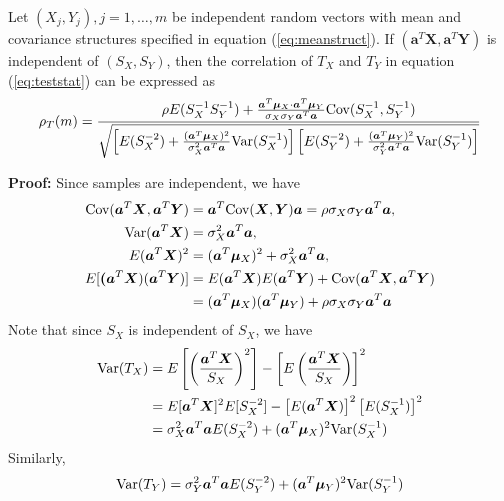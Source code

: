 \begin{theorem}\label{thm:teststatcor}
	Let $(X_j, Y_j), j = 1, \ldots, m$ be independent random vectors with mean and covariance 
	structures specified in equation (\ref{eq:meanstruct}). If $(\bm a^T\bm X, \bm a^T\bm Y)$ 
	is independent of $(S_X, S_Y)$, then the correlation of $T_X$ and $T_Y$ in equation 
	(\ref{eq:teststat}) can be expressed as 
	\begin{equation}\label{eq:teststatcor}
	\rho_T(m) = \frac{ \rho E(S_X^{-1}S_Y^{-1}) + \frac{\bm a^T\bm \mu_X\cdot \bm a^T\bm 
			\mu_Y}{\sigma_X\sigma_Y\bm a^T\bm a}\text{Cov}(S_X^{-1}, S_Y^{-1}) 
	}{\sqrt{\left[E(S_X^{-2}) 
		+ \frac{(\bm a^T\bm \mu_X)^2}{\sigma_X^2\bm a^T\bm 
			a}\text{Var}(S_X^{-1})\right]\left[E(S_Y^{-2}) + \frac{(\bm a^T\bm 
			\mu_Y)^2}{\sigma_Y^2\bm 
			a^T\bm a}\text{Var}(S_Y^{-1})\right]}}
\end{equation}
\end{theorem}
\textbf{Proof:} Since samples are independent, we have 
\begin{equation}\label{eq:testprepare}
\begin{aligned}
\text{Cov}(\bm a^T\bm X, \bm a^T\bm Y) &= \bm a^T \text{Cov}(\bm X, \bm Y)\bm a  = \rho\sigma_X\sigma_Y\bm 
a^T\bm a, \\
\text{Var}(\bm a^T\bm X)&  = \sigma_X^2\bm a^T\bm a, \\
E(\bm a^T\bm X)^2& =(\bm a^T\bm \mu_X)^2 + \sigma_X^2\bm a^T\bm a, \\
E[\bm (\bm a^T\bm X)(\bm a^T\bm Y)] &=E(\bm a^T\bm X)E(\bm a^T\bm Y) + \text{Cov}(\bm a^T\bm X, \bm 
a^T\bm Y)  	\\& = (\bm a^T\bm \mu_X)(\bm a^T\bm \mu_Y) + \rho \sigma_X\sigma_Y\bm a^T\bm a
\end{aligned}
\end{equation}
Note that since $S_X$ is independent of $S_X$, we have 
\begin{equation}\label{eq:testdenom1}
\begin{aligned}
\text{Var}(T_X) &= E\left[\left(\frac{\bm a^T\bm X}{S_X}\right)^2\right] - \left[E\left(\frac{\bm 
	a^T\bm X}{S_X}\right)\right]^2\\
& = E[\bm a^T\bm X]^2E[S_X^{-2}] - \left[E(\bm a^T\bm X)\right]^2\left[E(S_X^{-1})\right]^2\\
& = \sigma_X^2\bm a^T\bm a E(S_X^{-2}) + (\bm a^T\bm \mu_X)^2\text{Var}(S_X^{-1})
\end{aligned}
\end{equation}
Similarly, 
\begin{equation}\label{eq:testdenom2}
\text{Var}(T_Y)= \sigma_Y^2\bm a^T\bm a E(S_Y^{-2}) + (\bm a^T\bm \mu_Y)^2\text{Var}(S_Y^{-1})
\end{equation}
